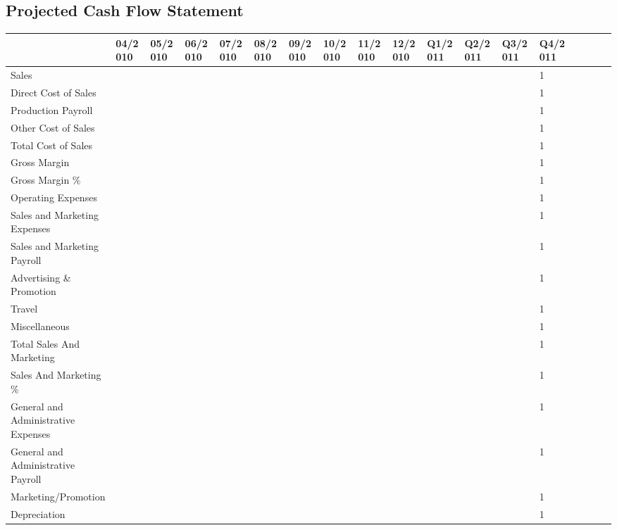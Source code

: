 \documentclass[11pt,titlepage]{article}
\begin{document}
\begin{landscape}
\subsection{Projected Cash Flow Statement}
\begin{scriptsize}
\begin{tabular}{ | l | l | l | l | l | l | l | l | l | l | l | l | l | l | l | l | l | l |}\hline
  & 04/2010 & 05/2010 & 06/2010 & 07/2010 & 08/2010 & 09/2010 & 10/2010 & 11/2010 & 12/2010 & Q1/2011 & Q2/2011 & Q3/2011 & Q4/2011\\\hline
  Sales & & & & & & & & & & & & & 1\\\hline
  Direct Cost of Sales & & & & & & & & & & & & & 1\\\hline
  Production Payroll & & & & & & & & & & & & & 1\\\hline
  Other Cost of Sales & & & & & & & & & & & & & 1\\\hline
  Total Cost of Sales & & & & & & & & & & & & & 1\\\hline
  Gross Margin & & & & & & & & & & & & & 1\\\hline
  Gross Margin \% & & & & & & & & & & & & & 1\\\hline
  Operating Expenses & & & & & & & & & & & & & 1\\\hline
  Sales and Marketing Expenses & & & & & & & & & & & & & 1\\\hline
  Sales and Marketing Payroll & & & & & & & & & & & & & 1\\\hline
  Advertising \& Promotion & & & & & & & & & & & & & 1\\\hline
  Travel & & & & & & & & & & & & & 1\\\hline
  Miscellaneous & & & & & & & & & & & & & 1\\\hline
  Total Sales And Marketing & & & & & & & & & & & & & 1\\\hline
  Sales And Marketing \% & & & & & & & & & & & & & 1\\\hline
  General and Administrative Expenses & & & & & & & & & & & & & 1\\\hline
  General and Administrative Payroll & & & & & & & & & & & & & 1\\\hline
  Marketing/Promotion & & & & & & & & & & & & & 1\\\hline
  Depreciation & & & & & & & & & & & & & 1\\\hline

\end{tabular}
\end{scriptsize}
\end{landscape}
\end{document}
